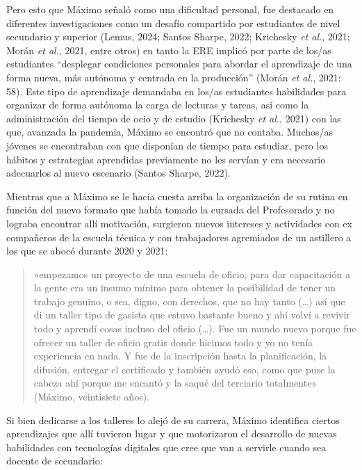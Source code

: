 Pero esto que Máximo señaló como una dificultad personal, fue destacado en diferentes investigaciones como un desafío compartido por estudiantes de nivel secundario y superior (Lemus, 2024; Santos Sharpe, 2022; Krichesky \emph{et al.}, 2021; Morán \emph{et al.}, 2021, entre otros) en tanto la ERE implicó por parte de los/as estudiantes ``desplegar condiciones personales para abordar el aprendizaje de una forma nueva, más autónoma y centrada en la producción'' (Morán \emph{et al.}, 2021: 58). Este tipo de aprendizaje demandaba en los/as estudiantes habilidades para organizar de forma autónoma la carga de lecturas y tareas, así como la administración del tiempo de ocio y de estudio (Krichesky \emph{et al.}, 2021) con las que, avanzada la pandemia, Máximo se encontró que no contaba. Muchos/as jóvenes se encontraban con que disponían de tiempo para estudiar, pero los hábitos y estrategias aprendidas previamente no les servían y era necesario adecuarlos al nuevo escenario (Santos Sharpe, 2022).

Mientras que a Máximo se le hacía cuesta arriba la organización de su rutina en función del nuevo formato que había tomado la cursada del Profesorado y no lograba encontrar allí motivación, surgieron nuevos intereses y actividades con ex compañeros de la escuela técnica y con trabajadores agremiados de un astillero a los que se abocó durante 2020 y 2021:

\begin{quote}
«empezamos un proyecto de una escuela de oficio, para dar capacitación a la gente era un insumo mínimo para obtener la posibilidad de tener un trabajo genuino, o sea, digno, con derechos, que no hay tanto (\ldots) así que di un taller tipo de gasista que estuvo bastante bueno y ahí volví a revivir todo y aprendí cosas incluso del oficio (\ldots). Fue un mundo nuevo porque fue ofrecer un taller de oficio gratis donde hicimos todo y yo no tenía experiencia en nada. Y fue de la inscripción hasta la planificación, la difusión, entregar el certificado y también ayudó eso, como que puse la cabeza ahí porque me encantó y la saqué del terciario totalmente» (Máximo, veintisiete años).
\end{quote}

Si bien dedicarse a los talleres lo alejó de su carrera, Máximo identifica ciertos aprendizajes que allí tuvieron lugar y que motorizaron el desarrollo de nuevas habilidades con tecnologías digitales que cree que van a servirle cuando sea docente de secundario:

